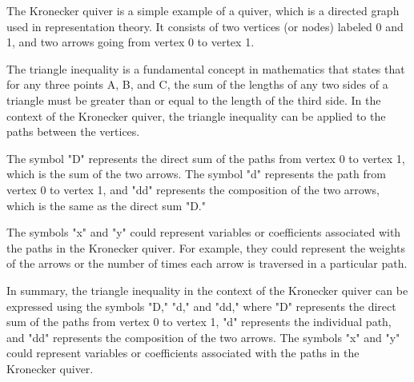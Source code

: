 The Kronecker quiver is a simple example of a quiver, which is a directed graph used in representation theory. It consists of two vertices (or nodes) labeled 0 and 1, and two arrows going from vertex 0 to vertex 1.

The triangle inequality is a fundamental concept in mathematics that states that for any three points A, B, and C, the sum of the lengths of any two sides of a triangle must be greater than or equal to the length of the third side. In the context of the Kronecker quiver, the triangle inequality can be applied to the paths between the vertices.

The symbol "D" represents the direct sum of the paths from vertex 0 to vertex 1, which is the sum of the two arrows. The symbol "d" represents the path from vertex 0 to vertex 1, and "dd" represents the composition of the two arrows, which is the same as the direct sum "D."

The symbols "x" and "y" could represent variables or coefficients associated with the paths in the Kronecker quiver. For example, they could represent the weights of the arrows or the number of times each arrow is traversed in a particular path.

In summary, the triangle inequality in the context of the Kronecker quiver can be expressed using the symbols "D," "d," and "dd," where "D" represents the direct sum of the paths from vertex 0 to vertex 1, "d" represents the individual path, and "dd" represents the composition of the two arrows. The symbols "x" and "y" could represent variables or coefficients associated with the paths in the Kronecker quiver.